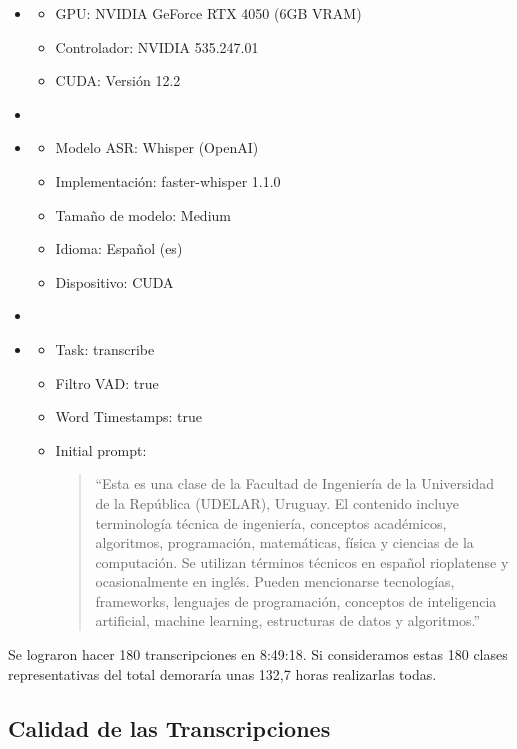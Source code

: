 \begin{itemize}
    \item[\textbf{Hardware:}]
    \begin{itemize}
        \item GPU: NVIDIA GeForce RTX 4050 (6GB VRAM)
        \item Controlador: NVIDIA 535.247.01
        \item CUDA: Versión 12.2
    \end{itemize}
    \item 
    \item[\textbf{Software:}]
    \begin{itemize}
        \item Modelo ASR: Whisper (OpenAI)
        \item Implementación: faster-whisper 1.1.0
        \item Tamaño de modelo: Medium
        \item Idioma: Español (es)
        \item Dispositivo: CUDA
    \end{itemize}
    \item 
    \item[\textbf{Configuración:}]
    \begin{itemize}
        \item Task: transcribe
        \item Filtro VAD: true
        \item Word Timestamps: true
        \item Initial prompt: 
        \begin{quote}
               ``Esta es una clase de la Facultad de Ingeniería de la Universidad de la República (UDELAR), Uruguay. El contenido incluye terminología técnica de ingeniería, conceptos académicos, algoritmos, programación, matemáticas, física y ciencias de la computación. Se utilizan términos técnicos en español rioplatense y ocasionalmente en inglés. Pueden mencionarse tecnologías, frameworks, lenguajes de programación, conceptos de inteligencia artificial, machine learning, estructuras de datos y algoritmos.''
        \end{quote}
    \end{itemize}
\end{itemize}

Se lograron hacer 180 transcripciones en 8:49:18. Si consideramos estas 180 clases representativas del total demoraría unas 132,7 horas realizarlas todas. 

\subsection{Calidad de las Transcripciones}
\label{subsection:Calidad de las Transcripciones}

